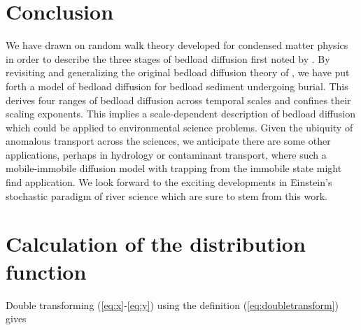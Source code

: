 \documentclass[]{agujournal2018}
\begin{document}



\section{Conclusion}
We have drawn on random walk theory developed for condensed matter physics in order to describe the three stages of bedload diffusion first noted by \citet{Nikora2001a,Nikora2002}.
By revisiting and generalizing the original bedload diffusion theory of \citet{Einstein1937}, we have put forth a model of bedload diffusion for bedload sediment undergoing burial.
This derives four ranges of bedload diffusion across temporal scales and confines their scaling exponents.
This implies a scale-dependent description of bedload diffusion which could be applied to environmental science problems.
Given the ubiquity of anomalous transport across the sciences, we anticipate there are some other applications, perhaps in hydrology or contaminant transport, where such a mobile-immobile diffusion model with trapping from the immobile state might find application.
We look forward to the exciting developments in Einstein's stochastic paradigm of river science which are sure to stem from this work.


\appendix

\section{Calculation of the distribution function}
\label{sec:appendixA}
Double transforming (\ref{eq:x}-\ref{eq:y}) using the definition (\ref{eq:doubletransform}) gives
\end{document}

